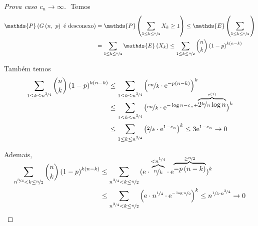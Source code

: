 \begin{proof}[Prova caso $c_n\rightarrow\infty$]
  $ $\newline
  Temos
  \vspace*{-\baselineskip}
  \begin{align*}
    \mathds{P}\left(G\left(n,\ p\vphantom{1j}\right)\text{ é desconexo}\vphantom{1j}\right)
      &=    \mathds{P}\left(\sum_{1\leq k\leq\nicefrac{n}{2}}X_k\geq 1\vphantom{1j}\right)
      \leq  \mathds{E}\left(\sum_{1\leq k\leq\nicefrac{n}{2}}\vphantom{1j}\right)                                                     \\
      &=    \sum_{1\leq k\leq\nicefrac{n}{2}}\mathds{E}\left(X_k\vphantom{1j}\right)
      \leq  \sum_{1\leq k\leq\nicefrac{n}{2}}\binom{n}{k}\left(1-p\vphantom{1j}\right)^{k\left(n-k\vphantom{1j}\right)}
  \end{align*}

  Também temos
  \begin{align*}
    \sum_{1\leq k\leq n^{\nicefrac{3}{4}}}\binom{n}{k}\left(1-p\vphantom{1j}\right)^{k\left(n-k\vphantom{1j}\right)}
      &\leq \sum_{1\leq k\leq n^{\nicefrac{3}{4}}}\left(\nicefrac{\mathrm{e} n}{k}\cdot\mathrm{e}^{-p\left(n-k\vphantom{1j}\right)}\vphantom{1j}\right)^k                  \\
      &\leq \sum_{1\leq k\leq n^{\nicefrac{3}{4}}}
              \left(\nicefrac{\mathrm{e} n}{k}\cdot\mathrm{e}^{-\log n-c_n+\smash{\overbrace{2\nicefrac{k}{n}\log n}^{o(1)}}}\vphantom{1j}\right)^k    \\
      &\leq \sum_{1\leq k\leq n^{\nicefrac{3}{4}}}\left(\nicefrac{2}{k}\cdot\mathrm{e}^{1-c_n}\vphantom{1j}\right)^k
      \leq  3\mathrm{e}^{1-c_n} 
      \rightarrow 0
  \end{align*}

  Ademais,
  \begin{align*}
    \sum_{n^{\nicefrac{3}{4}}<k\leq\nicefrac{n}{2}}\binom{n}{k}\left(1-p\vphantom{1j}\right)^{k\left(n-k\vphantom{1j}\right)}
      &\leq \sum_{n^{\nicefrac{3}{4}}<k\leq\nicefrac{n}{2}}
              \left(\mathrm{e}\cdot\smash{\overbrace{\nicefrac{n}{k}}^{<n^{\nicefrac{1}{4}}}}\cdot
              \mathrm{e}^{\smash{\overbrace{-p\left(n-k\vphantom{1j}\right)}^{\geq\nicefrac{n}{2}}}}\vphantom{1j}\right)^k                             \\
      &\leq \sum_{n^{\nicefrac{3}{4}}<k\leq\nicefrac{n}{2}}\left(\mathrm{e}\cdot n^{\nicefrac{1}{4}}\cdot\mathrm{e}^{\nicefrac{-\log n}{2}}\vphantom{1j}\right)^k
      \leq  n^{\nicefrac{1}{5}\cdot n^{\nicefrac{3}{4}}}
      \rightarrow 0
  \end{align*}
\end{proof}

